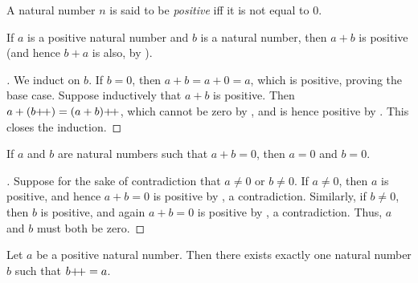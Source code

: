 \begin{defn}\label{i:2.2.7}
  A natural number \(n\) is said to be \emph{positive} iff it is not equal to \(0\).
\end{defn}

\begin{prop}\label{i:2.2.8}
  If \(a\) is a positive natural number and \(b\) is a natural number, then \(a + b\) is positive (and hence \(b + a\) is also, by ).
\end{prop}

\begin{proof}[]
  We induct on \(b\).
  If \(b = 0\), then \(a + b = a + 0 = a\), which is positive, proving the base case.
  Suppose inductively that \(a + b\) is positive.
  Then \(a + (b{+}\!{+}) = (a + b){+}\!{+}\), which cannot be zero by , and is hence positive by .
  This closes the induction.
\end{proof}

\begin{cor}\label{i:2.2.9}
  If \(a\) and \(b\) are natural numbers such that \(a + b = 0\), then \(a = 0\) and \(b = 0\).
\end{cor}

\begin{proof}[]
  Suppose for the sake of contradiction that \(a \neq 0\) or \(b \neq 0\).
  If \(a \neq 0\), then \(a\) is positive, and hence \(a + b = 0\) is positive by , a contradiction.
  Similarly, if \(b \neq 0\), then \(b\) is positive, and again \(a + b = 0\) is positive by , a contradiction.
  Thus, \(a\) and \(b\) must both be zero.
\end{proof}

\begin{lem}\label{i:2.2.10}
  Let \(a\) be a positive natural number.
  Then there exists exactly one natural number \(b\) such that \(b{+}\!{+} = a\).
\end{lem}

